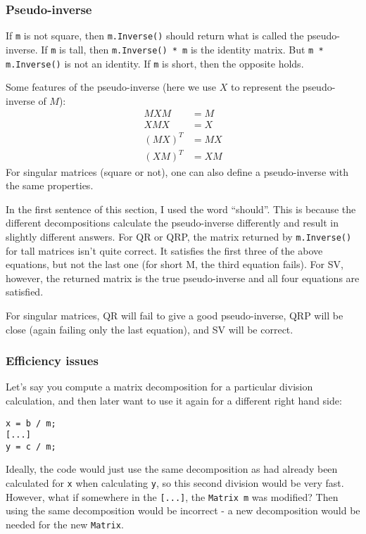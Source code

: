 \documentclass[twoside,letterpaper,11pt]{article}
\renewcommand{\tt}[1]{{\texttt {#1}}}
\begin{document}
\subsubsection{Pseudo-inverse}
\label{pseudoinverse}

If \tt{m} is not square, then \tt{m.Inverse()} should return what is called the pseudo-inverse.
If \tt{m} is tall, then \tt{m.Inverse() * m} is the identity matrix.  But \tt{m * m.Inverse()}
is not an identity.  If \tt{m} is short, then the opposite holds.

Some features of the pseudo-inverse (here we use $X$ to represent the pseudo-inverse
of $M$):
\begin{align*}
M X M &= M \\
X M X &= X \\
(M X)^T &= M X \\
(X M)^T &= X M 
\end{align*}
For singular matrices (square or not),
one can also define a pseudo-inverse with the same properties.

In the first sentence of this section, I used the word ``should''.  
This is because the different decompositions calculate the pseudo-inverse 
differently and result in slightly
different answers.  For QR or QRP, the matrix returned by \tt{m.Inverse()} for
tall matrices isn't
quite correct.  It satisfies the first three of the above equations,
but not the last one
(for short M, the third equation fails).  For SV, however,
the returned matrix is the true pseudo-inverse and all four equations are satisfied.

For singular matrices, QR will fail to give a good pseudo-inverse, QRP will be close
(again failing only the last equation), and SV will be correct.

\subsubsection{Efficiency issues}
\label{efficiency}

Let's say you compute a matrix decomposition for a particular division calculation, and
then later want to use it again for a different right hand side:
\begin{verbatim}
x = b / m;
[...]
y = c / m;
\end{verbatim}
Ideally, the code would just use the same decomposition as had already been calculated
for \tt{x} when calculating \tt{y}, so this second division would be very fast.
However, what if somewhere in the \tt{[...]}, the \tt{Matrix m} was modified?  
Then using
the same decomposition would be incorrect - a new decomposition would be needed
for the new \tt{Matrix}.
\end{document}

